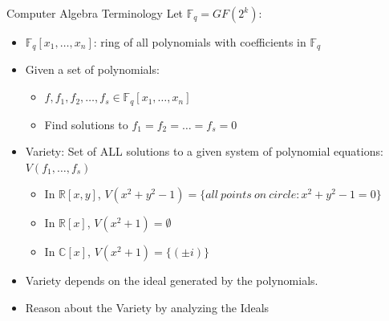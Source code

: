 \documentclass[xcolor=dvipsnames]{beamer}
\begin{document}
\begin{frame}{\large{Computer Algebra Terminology}}
\vspace{-0.2in}
Let $\mathbb{F}_q = GF(2^k)$:
\begin{itemize}
\item $\mathbb{F}_q[x_1, \ldots, x_n]$: ring of all polynomials with
  coefficients in $\mathbb{F}_q$ 
\item Given a set of polynomials:
\begin{itemize}
\item $f, f_1, f_2, \dots , f_s \in \mathbb{F}_q[x_1, \dots, x_n]$
\item Find solutions to $f_1 = f_2 = \dots = f_s = 0$
\end{itemize}
\item \alert{Variety:} Set of ALL solutions to a given system of polynomial equations: $V(f_1, \dots, f_s)$
	\begin{itemize}
	\item In $\mathbb{R}\left[x,y\right]$, $V(x^2+y^2-1)=\{all\  points\  on\ circle: x^2+y^2-1=0\}$
	\item In $\mathbb{R}[x]$, $V(x^2+1)=\emptyset$
	\item In $\mathbb{C}[x]$, $V(x^2+1)=\{(\pm i)\}$
	\end{itemize}
\item Variety depends on the \alert{ideal} generated by the polynomials.
\item Reason about the Variety by analyzing the Ideals
\end{itemize}


\end{frame}
\end{document}
